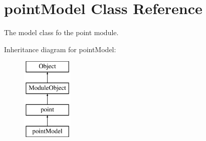 \hypertarget{classpointModel}{}\section{point\+Model Class Reference}
\label{classpointModel}


The model class fo the point module.  


Inheritance diagram for point\+Model\+:\begin{figure}[H]
\begin{center}
\leavevmode
\includegraphics[height=4.000000cm]{classpointModel}
\end{center}
\end{figure}
